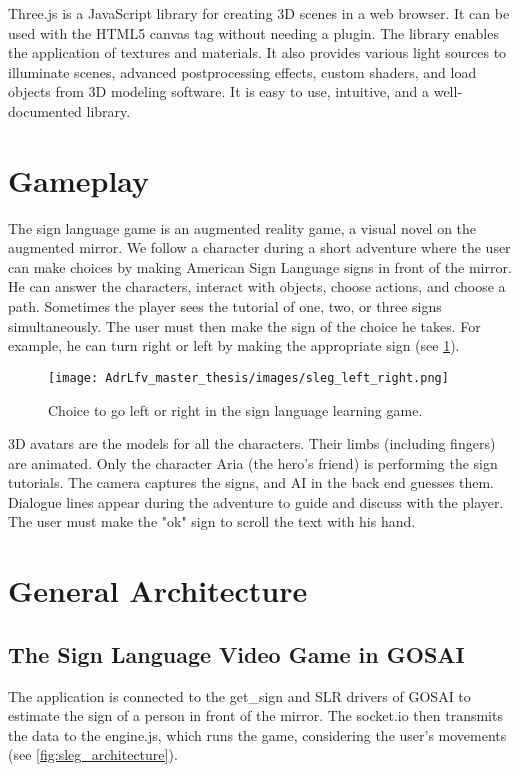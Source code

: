 Three.js is a JavaScript library for creating 3D scenes in a web browser. It can be used with the HTML5 canvas tag without needing a plugin. The library enables the application of textures and materials. It also provides various light sources to illuminate scenes, advanced postprocessing effects, custom shaders, and load objects from 3D modeling software. It is easy to use, intuitive, and a well-documented library.

\section{Gameplay}

The sign language game is an augmented reality game, a visual novel on the augmented mirror. We follow a character during a short adventure where the user can make choices by making American Sign Language signs in front of the mirror. He can answer the characters, interact with objects, choose actions, and choose a path. 
Sometimes the player sees the tutorial of one, two, or three signs simultaneously. The user must then make the sign of the choice he takes. For example, he can turn right or left by making the appropriate sign (see \ref{fig:sleg_left_right}). 

\begin{figure}[h]
    \centering
    \texttt{[image: AdrLfv\_master\_thesis/images/sleg\_left\_right.png]}
    \caption{Choice to go left or right in the sign language learning game.}
    \label{fig:sleg_left_right}
\end{figure}

3D avatars are the models for all the characters. Their limbs (including fingers) are animated. Only the character Aria (the hero's friend) is performing the sign tutorials.
The camera captures the signs, and AI in the back end guesses them. Dialogue lines appear during the adventure to guide and discuss with the player. The user must make the "ok" sign to scroll the text with his hand.



\section{General Architecture}

\subsection{The Sign Language Video Game in GOSAI}

The application is connected to the get\_sign and SLR drivers of GOSAI to estimate the sign of a person in front of the mirror. The socket.io then transmits the data to the engine.js, which runs the game, considering the user's movements (see \ref{fig:sleg_architecture}).

